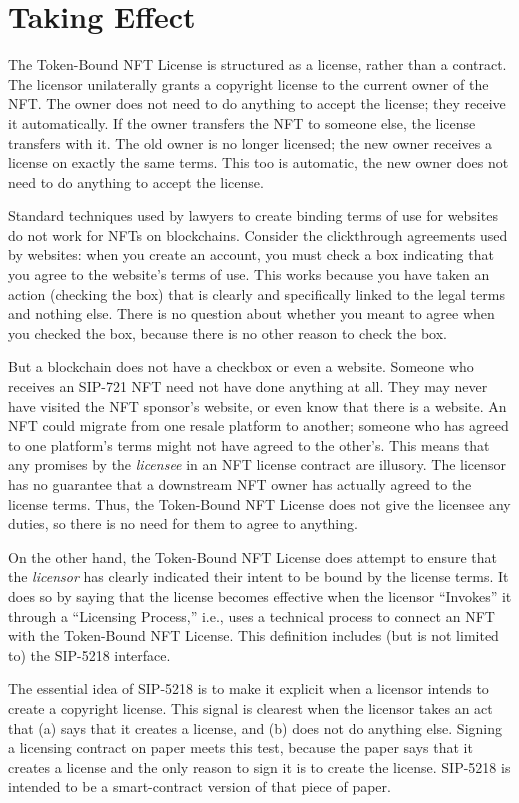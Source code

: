 \documentclass{article}
\newcommand{\eiplicense}{SIP-5218\xspace}
\newcommand{\iccclicense}{Token-Bound NFT License\xspace}
\begin{document}
\section{Taking Effect}

The \iccclicense is structured as a license, rather than a contract. The licensor unilaterally grants a copyright license to the current owner of the NFT. The owner does not need to do anything to accept the license; they receive it automatically. If the owner transfers the NFT to someone else, the license transfers with it. The old owner is no longer licensed; the new owner receives a license on exactly the same terms. This too is automatic, the new owner does not need to do anything to accept the license.

Standard techniques used by lawyers to create binding terms of use for websites do not work for NFTs on blockchains. Consider the clickthrough agreements used by websites: when you create an account, you must check a box indicating that you agree to the website's terms of use. This works because you have taken an action (checking the box) that is clearly and specifically linked to the legal terms and nothing else. There is no question about whether you meant to agree when you checked the box, because there is no other reason to check the box. 

But a blockchain does not have a checkbox or even a website. Someone who receives an SIP-721 NFT need not have done anything at all. They may never have visited the NFT sponsor's website, or even know that there is a website. An NFT could migrate from one resale platform to another; someone who has agreed to one platform's terms might not have agreed to the other's. This means that any promises by the \emph{licensee} in an NFT license contract are illusory. The licensor has no guarantee that a downstream NFT owner has actually agreed to the license terms. Thus, the \iccclicense does not give the licensee any duties, so there is no need for them to agree to anything.

On the other hand, the \iccclicense does attempt to ensure that the \emph{licensor} has clearly indicated their intent to be bound by the license terms. It does so by saying that the license becomes effective when the licensor ``Invokes'' it through a ``Licensing Process,'' i.e., uses a technical process to connect an NFT with the \iccclicense. This definition includes (but is not limited to) the \eiplicense interface. 

The essential idea of \eiplicense  is to make it explicit when a licensor intends to create a copyright license. This signal is clearest when the licensor takes an act that (a) says that it creates a license, and (b) does not do anything else. Signing a licensing contract on paper meets this test, because the paper says that it creates a license and the only reason to sign it is to create the license. \eiplicense is intended to be a smart-contract version of that piece of paper. 
\end{document}
